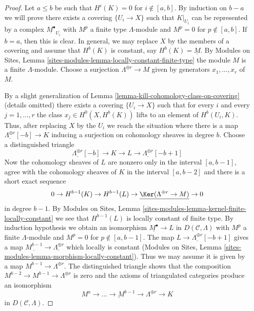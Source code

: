 \begin{proof}
Let $a \leq b$ be such that $H^i(K) = 0$ for $i \not \in [a, b]$.
By induction on $b - a$ we will prove there exists a covering
$\{U_i \to X\}$ such that $K|_{U_i}$ can be represented by a complex
$\underline{M^\bullet}_{U_i}$ with $M^p$ a finite type $\Lambda$-module
and $M^p = 0$ for $p \not \in [a, b]$. If $b = a$, then
this is clear. In general, we may replace $X$ by the members
of a covering and assume that $H^b(K)$ is constant, say
$H^b(K) = \underline{M}$. By Modules on Sites, Lemma
\ref{sites-modules-lemma-locally-constant-finite-type}
the module $M$ is a finite $\Lambda$-module. Choose a surjection
$\Lambda^{\oplus r} \to M$ given by generators $x_1, \ldots, x_r$
of $M$.

\medskip\noindent
By a slight generalization of
Lemma \ref{lemma-kill-cohomology-class-on-covering} (details omitted)
there exists a covering $\{U_i \to X\}$ such that for every $i$ and every $j = 1, \ldots, r$
the class $x_j \in H^0(X, H^b(K))$ lifts to an element of $H^b(U_i, K)$. Thus, after replacing $X$ by the
$U_i$ we reach the situation where there is a map
$\underline{\Lambda^{\oplus r}}[-b] \to K$
inducing a surjection on cohomology sheaves in degree $b$.
Choose a distinguished triangle
$$
\underline{\Lambda^{\oplus r}}[-b] \to K \to L \to
\underline{\Lambda^{\oplus r}}[-b + 1]
$$
Now the cohomology sheaves of $L$ are nonzero only in the interval
$[a, b - 1]$, agree with the cohomology sheaves of $K$ in the interval
$[a, b - 2]$ and there is a short exact sequence
$$
0 \to H^{b - 1}(K) \to H^{b - 1}(L) \to
\underline{\Ker(\Lambda^{\oplus r} \to M)} \to 0
$$
in degree $b - 1$. By
Modules on Sites, Lemma
\ref{sites-modules-lemma-kernel-finite-locally-constant}
we see that $H^{b - 1}(L)$ is locally constant of finite type.
By induction hypothesis we obtain an isomorphism
$\underline{M^\bullet} \to L$ in $D(\mathcal{C}, \Lambda)$
with $M^p$ a finite $\Lambda$-module and $M^p = 0$ for
$p \not \in [a, b - 1]$. The map $L \to \underline{\Lambda^{\oplus r}}[-b + 1]$
gives a map $\underline{M^{b - 1}} \to \underline{\Lambda^{\oplus r}}$
which locally is constant
(Modules on Sites, Lemma
\ref{sites-modules-lemma-morphism-locally-constant}).
Thus we may assume it is given by a map $M^{b - 1} \to \Lambda^{\oplus r}$.
The distinguished triangle shows that the composition
$M^{b - 2} \to M^{b - 1} \to \Lambda^{\oplus r}$ is zero
and the axioms of triangulated categories produce an isomorphism
$$
\underline{M^a \to \ldots \to M^{b - 1} \to \Lambda^{\oplus r}}
\longrightarrow K
$$
in $D(\mathcal{C}, \Lambda)$.
\end{proof}

